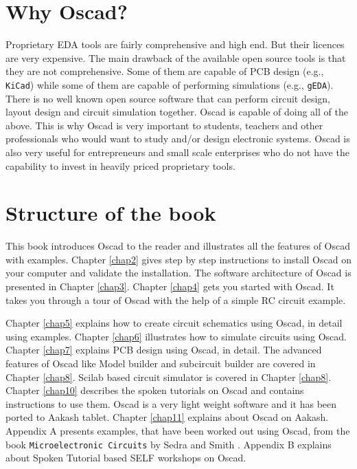 \section{Why Oscad?}
Proprietary EDA tools are fairly comprehensive and high end. But their licences are very expensive. The main drawback of the available open source tools is that they are not comprehensive. Some of them are capable of PCB design (e.g., {\tt KiCad}) while some of them are capable of performing simulations (e.g., {\tt gEDA}). There is no well known open source software that can perform circuit design, layout design and circuit simulation together. Oscad is capable of doing all of the above. This is why Oscad is very important to students, teachers and other professionals who would want to study and/or design electronic systems. Oscad is also very useful for entrepreneurs and small scale enterprises who do not have the capability to invest in heavily priced proprietary tools.
\section{Structure of the book}
This book introduces Oscad to the reader and illustrates all the features of Oscad with examples. Chapter \ref{chap2} gives step by step instructions to install Oscad on your computer and validate the installation. The software architecture of Oscad is presented in Chapter \ref{chap3}. Chapter \ref{chap4} gets you started with Oscad. It takes you through a tour of Oscad with the help of a simple RC circuit example.

 Chapter \ref{chap5} explains how to create circuit schematics using Oscad, in detail using examples. Chapter \ref{chap6} illustrates how to simulate circuits using Oscad. Chapter \ref{chap7} explains PCB design using Oscad, in detail. The advanced features of Oscad like Model builder and subcircuit builder are covered in Chapter \ref{chap8}. Scilab based circuit simulator is covered in Chapter \ref{chap8}. Chapter \ref{chap10} describes the spoken tutorials on Oscad and contains instructions to use them. Oscad is a very light weight software and it has been ported to Aakash tablet. Chapter \ref{chap11} explains about Oscad on Aakash. Appendix A presents examples, that have been worked out using Oscad, from the book {\tt Microelectronic Circuits} by Sedra and Smith \cite{sedra}. Appendix B explains about Spoken Tutorial based SELF workshops on Oscad.









%
